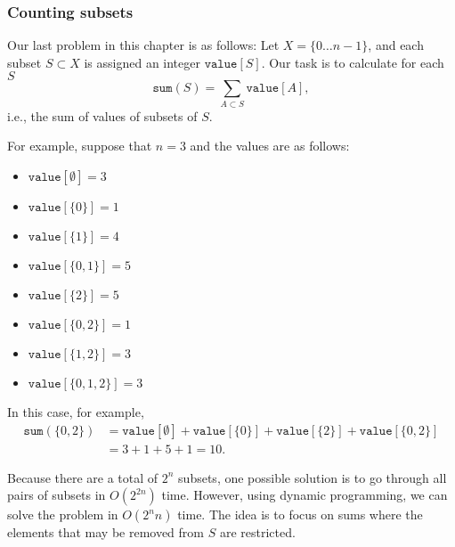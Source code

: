 \subsubsection{Counting subsets}

Our last problem in this chapter is as follows:
Let $X=\{0 \ldots n-1\}$, and each subset $S \subset X$
is assigned an integer $\texttt{value}[S]$.
Our task is to calculate for each $S$
\[\texttt{sum}(S) = \sum_{A \subset S} \texttt{value}[A],\]
i.e., the sum of values of subsets of $S$.

For example, suppose that $n=3$ and the values are as follows:
\begin{multicols}{2}
\begin{itemize}
\item $\texttt{value}[\emptyset] = 3$
\item $\texttt{value}[\{0\}] = 1$
\item $\texttt{value}[\{1\}] = 4$
\item $\texttt{value}[\{0,1\}] = 5$
\item $\texttt{value}[\{2\}] = 5$
\item $\texttt{value}[\{0,2\}] = 1$
\item $\texttt{value}[\{1,2\}] = 3$
\item $\texttt{value}[\{0,1,2\}] = 3$
\end{itemize}
\end{multicols}
In this case, for example,
\begin{equation*}
\begin{split}
\texttt{sum}(\{0,2\}) &= \texttt{value}[\emptyset]+\texttt{value}[\{0\}]+\texttt{value}[\{2\}]+\texttt{value}[\{0,2\}] \\ 
                      &= 3 + 1 + 5 + 1 = 10.
\end{split}
\end{equation*}

Because there are a total of $2^n$ subsets,
one possible solution is to go through all
pairs of subsets in $O(2^{2n})$ time.
However, using dynamic programming, we
can solve the problem in $O(2^n n)$ time.
The idea is to focus on sums where the
elements that may be removed from $S$ are restricted.

